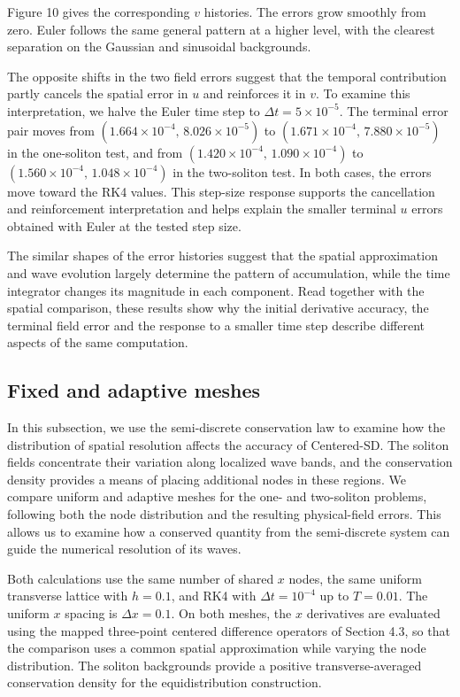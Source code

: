 \documentclass{article}
\theoremstyle{plain}
\theoremstyle{definition}
\begin{document}
Figure 10 gives the corresponding \(v\) histories. The errors grow smoothly from zero. Euler follows the same general pattern at a higher level, with the clearest separation on the Gaussian and sinusoidal backgrounds.

The opposite shifts in the two field errors suggest that the temporal contribution partly cancels the spatial error in \(u\) and reinforces it in \(v\). To examine this interpretation, we halve the Euler time step to \(\Delta t=5\times10^{-5}\). The terminal error pair moves from \((1.664\times10^{-4},\,8.026\times10^{-5})\) to \((1.671\times10^{-4},\,7.880\times10^{-5})\) in the one-soliton test, and from \((1.420\times10^{-4},\,1.090\times10^{-4})\) to \((1.560\times10^{-4},\,1.048\times10^{-4})\) in the two-soliton test. In both cases, the errors move toward the RK4 values. This step-size response supports the cancellation and reinforcement interpretation and helps explain the smaller terminal \(u\) errors obtained with Euler at the tested step size.

The similar shapes of the error histories suggest that the spatial approximation and wave evolution largely determine the pattern of accumulation, while the time integrator changes its magnitude in each component. Read together with the spatial comparison, these results show why the initial derivative accuracy, the terminal field error and the response to a smaller time step describe different aspects of the same computation.






\FloatBarrier
\subsection{Fixed and adaptive meshes}

In this subsection, we use the semi-discrete conservation law to examine how the distribution of spatial resolution affects the accuracy of Centered-SD. The soliton fields concentrate their variation along localized wave bands, and the conservation density provides a means of placing additional nodes in these regions. We compare uniform and adaptive meshes for the one- and two-soliton problems, following both the node distribution and the resulting physical-field errors. This allows us to examine how a conserved quantity from the semi-discrete system can guide the numerical resolution of its waves.

Both calculations use the same number of shared \(x\) nodes, the same uniform transverse lattice with \(h=0.1\), and RK4 with \(\Delta t=10^{-4}\) up to \(T=0.01\). The uniform \(x\) spacing is \(\Delta x=0.1\). On both meshes, the \(x\) derivatives are evaluated using the mapped three-point centered difference operators of Section 4.3, so that the comparison uses a common spatial approximation while varying the node distribution. The soliton backgrounds provide a positive transverse-averaged conservation density for the equidistribution construction.
\end{document}
